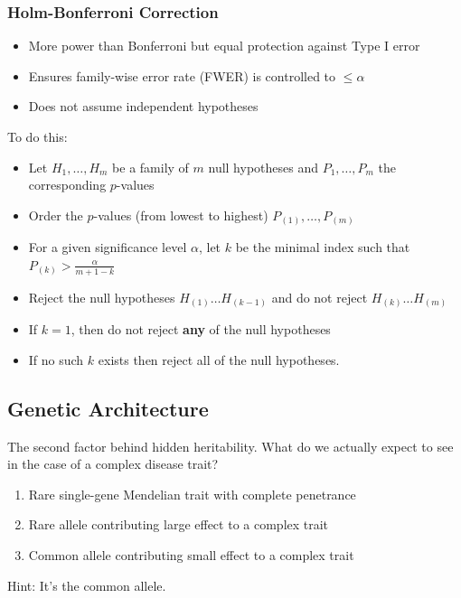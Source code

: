 \documentclass[10pt]{article}
\begin{document}
\subsubsection*{Holm-Bonferroni Correction}
\begin{itemize}
	\item More power than Bonferroni but equal protection against Type I error
	\item Ensures family-wise error rate (FWER) is controlled to $\leq \alpha$
	\item Does not assume independent hypotheses
\end{itemize}
To do this:
\begin{itemize}
	\item Let $H_1, \dots, H_m$ be a family of $m$ null hypotheses and $P_1, \dots, P_m$ the corresponding $p$-values
	\item Order the $p$-values (from lowest to highest) $P_{(1)}, \dots, P_{(m)}$
	\item For a given significance level $\alpha$, let $k$ be the minimal index such that $P_{(k)} > \frac{\alpha}{m + 1 - k}$
	\item Reject the null hypotheses $H_{(1)} \dots H_{(k - 1)}$ and do not reject $H_{(k)} \dots H_{(m)}$
	\item If $k = 1$, then do not reject \textbf{any} of the null hypotheses
	\item If no such $k$ exists then reject all of the null hypotheses.
\end{itemize}

\subsection*{Genetic Architecture}
The second factor behind hidden heritability.  What do we actually expect to see in the case of a complex disease trait?
\begin{enumerate}[label=\alph*)]
	\item Rare single-gene Mendelian trait with complete penetrance
	\item Rare allele contributing large effect to a complex trait
	\item Common allele contributing small effect to a complex trait
\end{enumerate}
Hint: It's the common allele.
\end{document}
